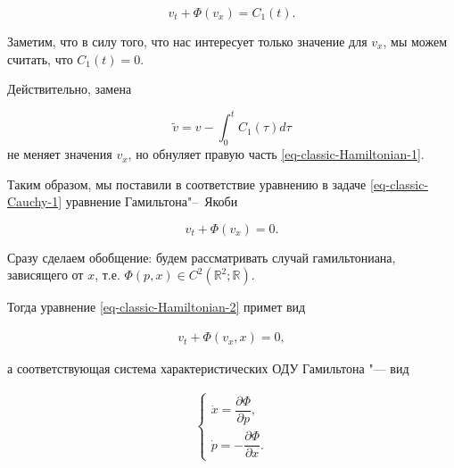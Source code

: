 \begin{equation}

v_t+\Phi(v_x)=C_1(t).

\label{eq-classic-Hamiltonian-1}

\end{equation}

Заметим, что в силу того, что нас интересует только значение для $v_x$, мы можем считать, что $C_1(t)=0$.

Действительно, замена 

$$

\widetilde{v}=v-\int_{0}^t C_1(\tau)d\tau$$ не меняет значения $v_x$, но обнуляет правую часть \eqref{eq-classic-Hamiltonian-1}. 

Таким образом, мы поставили в соответствие уравнению в задаче \eqref{eq-classic-Cauchy-1} уравнение Гамильтона"--~Якоби

\begin{equation}

v_t+\Phi(v_x)=0.

\label{eq-classic-Hamiltonian-2}

\end{equation}



Сразу сделаем обобщение: будем рассматривать случай гамильтониана, зависящего от $x$, т.е. $\Phi(p,x)\in C^2(\mathbb{R}^2;\mathbb{R})$. 

Тогда уравнение \eqref{eq-classic-Hamiltonian-2} примет вид

\begin{gather}

v_t+\Phi(v_x,x)=0,\label{eq-classic-Hamiltonian-3}

\end{gather}

а соответствующая система характеристических ОДУ Гамильтона "--- вид

\begin{gather}

\left\{\begin{array}{l}

\dot{x}=\dfrac{\partial\Phi}{\partial p},\\[2mm]

\dot{p}=-\dfrac{\partial\Phi}{\partial x}.

\end{array}\right.

\label{eq-classic-Hamiltonian-ODE}

\end{gather}

